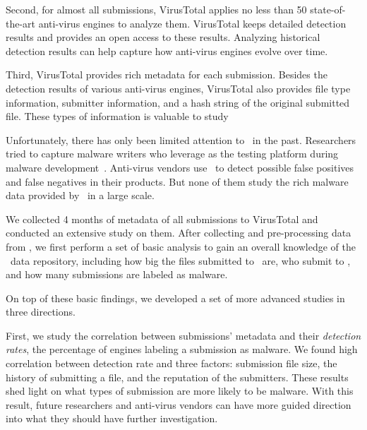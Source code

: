 Second, for almost all submissions, 
VirusTotal applies no less than 50 state-of-the-art anti-virus engines to analyze them. 
VirusTotal keeps detailed detection results and provides an open access to these results. 
Analyzing historical detection results can help capture how anti-virus engines evolve over time. 

Third, VirusTotal provides rich metadata for each submission. 
Besides the detection results of various anti-virus engines, 
VirusTotal also provides file type information, submitter information, and a hash string of the original submitted file.
These types of information is valuable to study 

Unfortunately, there has only been limited attention to \vt\ in the past. 
Researchers tried to capture malware writers who leverage \vt{} as the testing platform during malware development~\cite{huangvt2016bigdata, neeles}. 
Anti-virus vendors use \vt\ to detect possible false positives and false negatives in their products. 
But none of them study the rich malware data provided by \vt\ in a large scale. 

We collected 4 months of metadata of all submissions to VirusTotal 
and conducted an extensive study on them.
After collecting and pre-processing data from \vt, 
we first perform a set of basic analysis to gain an overall knowledge of the \vt\ data repository,
including how big the files submitted to \vt\ are, who submit to \vt, and how many submissions are labeled as malware.

On top of these basic findings, we developed a set of more advanced studies in three directions. 

First, we study the correlation between submissions’ metadata and their {\em detection rates}, 
the percentage of engines labeling a submission as malware. 
We found high correlation between detection rate 
and three factors: submission file size, the history of submitting a file, and the reputation of the submitters.
These results shed light on what types of submission are more likely to be malware.
With this result, future researchers and anti-virus vendors can have more guided direction 
into what they should have further investigation.

